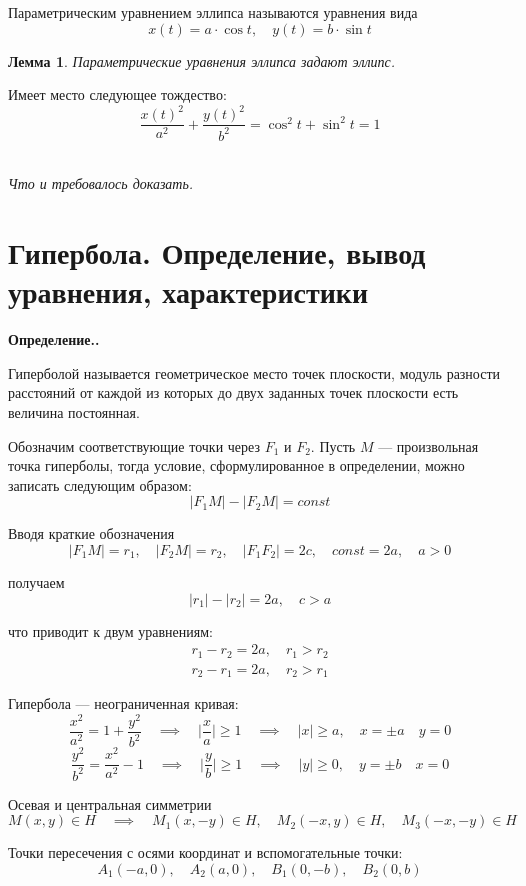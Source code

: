 \documentclass[a4paper,12pt,oneside]{extbook}
\newcommand{\newpar}{$ $\par\nobreak\ignorespaces}
\newenvironment{definition}[1][]{\noindent\textbf{Определение.\if\relax\detokenize{#1}\relax\else\;#1.\fi}\newpar}{\bigskip}
\theoremstyle{numbered}
\theoremstyle{unnumbered}
\theoremstyle{named}
\theoremstyle{unnumbered}
\theoremstyle{named}
\newtheorem{lemma}{Лемма}[section]
\theoremstyle{named}
\theoremstyle{named}
\renewenvironment{proof}[1][]{\breakenv[Доказательство]{\if\relax\detokenize{#1}\relax\else\;\fi}{\textbf{#1}}}{\smallskip\newpar \hfill\textit{Что и требовалось доказать.}}
\begin{document}
\begin{siderules}
    Параметрическим уравнением эллипса называются уравнения вида
    \[
        x(t) = a \cdot \cos{t}, \quad y(t) = b \cdot \sin{t}
    \]
\end{siderules}

\begin{lemma}
    Параметрические уравнения эллипса задают эллипс.
\end{lemma}

\begin{proof}
    Имеет место следующее тождество:
    \[
        \frac{{x(t)}^2}{a^2} + \frac{{y(t)}^2}{b^2} = \cos^2{t} + \sin^2{t} = 1
    \]
\end{proof}

\section{Гипербола. Определение, вывод уравнения, характеристики}%
\label{sec:Гипербола. Определение, вывод уравнения, характеристики}

\begin{definition}
    Гиперболой называется геометрическое место точек плоскости, модуль разности расстояний от каждой из которых до двух заданных точек плоскости есть величина постоянная.

    Обозначим соответствующие точки через \(F_1\) и \(F_2\).
    Пусть \(M\) — произвольная точка гиперболы, тогда условие, сформулированное в определении, можно записать следующим образом:
    \[
        |F_1 M| - |F_2 M| = const
    \]

    Вводя краткие обозначения
    \[
        |F_1 M| = r_1, \quad |F_2 M| = r_2, \quad |F_1 F_2| = 2c, \quad const = 2a, \quad a > 0
    \]

    получаем
    \[
        |r_1| - |r_2| = 2a, \quad c > a
    \]

    что приводит к двум уравнениям:
    \begin{gather*}
        r_1 - r_2 = 2a, \quad r_1 > r_2 \\
        r_2 - r_1 = 2a, \quad r_2 > r_1
    \end{gather*}

    Гипербола — неограниченная кривая:
    \[
        \frac{x^2}{a^2} = 1 + \frac{y^2}{b^2} \quad \implies \quad \Big|\frac{x}{a}\Big| \geq 1 \quad \implies \quad |x| \geq a, \quad x = \pm a \quad y = 0
    \]
    \[
        \frac{y^2}{b^2} = \frac{x^2}{a^2} - 1 \quad \implies \quad \Big|\frac{y}{b}\Big| \geq 1 \quad \implies \quad |y| \geq 0, \quad y = \pm b \quad x = 0
    \]

    Осевая и центральная симметрии
    \[
        M(x, y) \in H \quad \implies \quad M_1 (x, -y) \in H, \quad M_2 (-x, y) \in H, \quad M_3 (-x, -y) \in H
    \]

    Точки пересечения с осями координат и вспомогательные точки:
    \[
        A_1 (-a, 0), \quad A_2 (a, 0), \quad B_1 (0, -b), \quad B_2 (0, b)
    \]
\end{definition}
\end{document}
